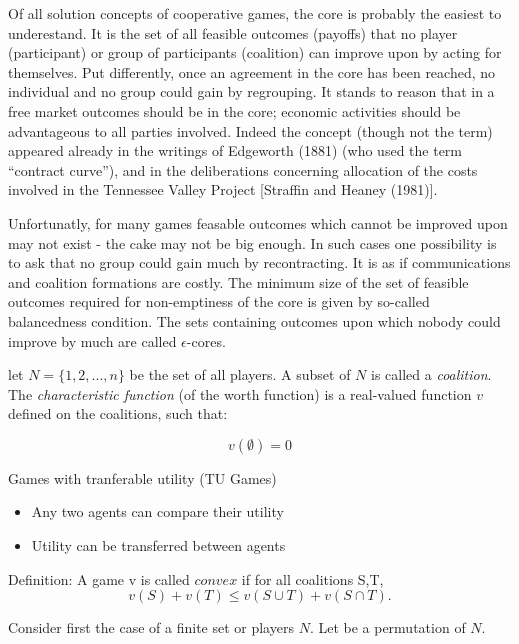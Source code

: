 \documentclass{article}
\begin{document}
Of all solution concepts of cooperative games, the core is probably the easiest to underestand. It is the set of all feasible outcomes (payoffs) that no player (participant) or group of participants (coalition) can improve upon by acting for themselves. Put differently, once an agreement in the core has been reached, no individual and no group could gain by regrouping. It stands to reason that in a free market outcomes should be in the core; economic activities should be advantageous to all parties involved. Indeed the concept (though not the term) appeared already in the writings of Edgeworth (1881) (who used the term ``contract curve''), and in the deliberations concerning allocation of the costs involved in the Tennessee Valley Project [Straffin and Heaney (1981)].

Unfortunatly, for many games feasable outcomes which cannot be improved upon may not exist - the cake may not be big enough. In such cases one possibility is to ask that no group could gain much by recontracting. It is as if communications and coalition formations are costly. The minimum size of the set of feasible outcomes required for non-emptiness of the core is given by so-called balancedness condition. The sets containing outcomes upon which nobody could improve by much are called $\epsilon$-cores. 

let $N = \{1,2,...,n\}$ be the set of all players. A subset of $N$ is called a \emph{coalition}. The \textit{characteristic function} (of the worth function) is a real-valued function $v$ defined on the coalitions, such that:

\begin{equation}\label{eq:v0}
v(\emptyset) = 0
\end{equation}


Games with tranferable utility (TU Games)
\begin{itemize}
	\item Any two agents can compare their utility
	\item Utility can be transferred between agents
\end{itemize}

Definition: A game v is called $convex$ if for all coalitions S,T,
\begin{equation}\label{eq:con1}
v(S) + v(T) \leq v(S \cup T) + v(S \cap T).
\end{equation}

Consider first the case of a finite set or players $N$. Let \pi be a permutation of $N$.
\end{document}
